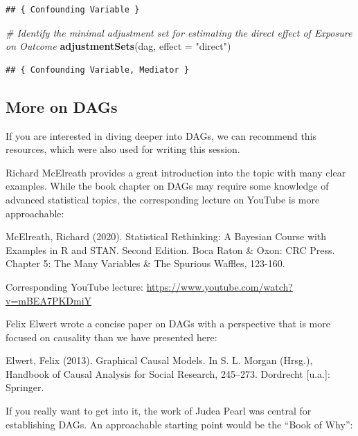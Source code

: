 \documentclass[
]{book}
\newenvironment{Shaded}{\begin{snugshade}}{\end{snugshade}}
\newcommand{\AttributeTok}[1]{\textcolor[rgb]{0.13,0.29,0.53}{#1}}
\newcommand{\CommentTok}[1]{\textcolor[rgb]{0.56,0.35,0.01}{\textit{#1}}}
\newcommand{\FunctionTok}[1]{\textcolor[rgb]{0.13,0.29,0.53}{\textbf{#1}}}
\newcommand{\NormalTok}[1]{#1}
\newcommand{\StringTok}[1]{\textcolor[rgb]{0.31,0.60,0.02}{#1}}
\begin{document}
\begin{verbatim}
## { Confounding Variable }
\end{verbatim}

\begin{Shaded}
\begin{Highlighting}[]
\CommentTok{\# Identify the minimal adjustment set for estimating the direct effect of Exposure on Outcome}
\FunctionTok{adjustmentSets}\NormalTok{(dag, }\AttributeTok{effect =} \StringTok{"direct"}\NormalTok{)}
\end{Highlighting}
\end{Shaded}

\begin{verbatim}
## { Confounding Variable, Mediator }
\end{verbatim}

\hypertarget{more-on-dags}{%
\subsection{More on DAGs}\label{more-on-dags}}

If you are interested in diving deeper into DAGs, we can recommend this
resources, which were also used for writing this session.

Richard McElreath provides a great introduction into the topic with many
clear examples. While the book chapter on DAGs may require some
knowledge of advanced statistical topics, the corresponding lecture on
YouTube is more approachable:

McElreath, Richard (2020). Statistical Rethinking: A Bayesian Course
with Examples in R and STAN. Second Edition. Boca Raton \& Oxon: CRC
Press. Chapter 5: The Many Variables \& The Spurious Waffles, 123-160.

Corresponding YouTube lecture:
\url{https://www.youtube.com/watch?v=mBEA7PKDmiY}

\hfill\break

Felix Elwert wrote a concise paper on DAGs with a perspective that is
more focused on causality than we have presented here:

Elwert, Felix (2013). Graphical Causal Models. In S. L. Morgan (Hrsg.),
Handbook of Causal Analysis for Social Research, 245--273. Dordrecht
{[}u.a.{]}: Springer.

\hfill\break

If you really want to get into it, the work of Judea Pearl was central
for establishing DAGs. An approachable starting point would be the ``Book
of Why'':
\end{document}
